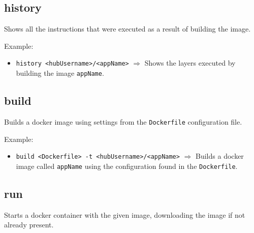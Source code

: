\documentclass[a4paper, 12pt]{article}
\begin{document}
\subsection{history}

Shows all the instructions that were executed as a result of building the image.

\vspace{0.5em}
Example:
\begin{itemize}
	\item \texttt{history <hubUsername>/<appName>} $\Rightarrow$ Shows the
	layers executed by building the image \texttt{appName}.
\end{itemize}

\subsection{build}

Builds a docker image using settings from the \texttt{Dockerfile} configuration
file.

\vspace{0.5em}
Example:
\begin{itemize}
	\item \texttt{build <Dockerfile> -t <hubUsername>/<appName>} $\Rightarrow$
	Builds a docker image called \texttt{appName} using the configuration found
	in the \texttt{Dockerfile}.
\end{itemize}

\subsection{run}

Starts a docker container with the given image, downloading the image if not
already present.
\end{document}
